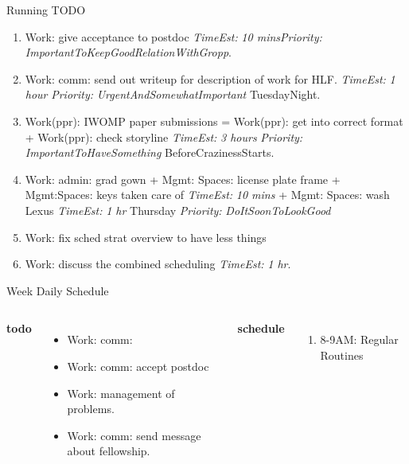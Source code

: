 \documentclass[serif, mathserif, final]{beamer}
\newcommand{\te}[1]{\textit{TimeEst:} \textit{#1}}
\newcommand{\prio}[1]{\textit{Priority:} \textit{#1}}
\newcommand{\dl}[1]{#1}
\begin{document}
\begin{frame}{}
\begin{columns}
\begin{column}{0.50\linewidth}
  \begin{block}{Running TODO} %
    \begin{enumerate}
    \item \small Work: give acceptance to postdoc \te{10
      mins}\prio{ImportantToKeepGoodRelationWithGropp}. 
      \small \item \small Work: comm: send out writeup for description
      of work for HLF. \te{1 hour} \prio{UrgentAndSomewhatImportant}
      \dl{TuesdayNight}.  
    \item \small Work(ppr): IWOMP paper submissions  =  Work(ppr): get into
      correct format  + Work(ppr): check storyline   \te{3 hours} 
      \prio{ImportantToHaveSomething} \dl{BeforeCrazinessStarts}. 
      \item \small  Work: admin: grad gown  + Mgmt: Spaces: license plate frame  + Mgmt:Spaces:
        keys taken care of \te{10 mins} + Mgmt: Spaces: wash
        Lexus \te{1 hr} \dl{Thursday} \prio{DoItSoonToLookGood} 
      \item \small Work: fix sched strat overview to have less things 
      \item \small Work: discuss the combined scheduling \te{1 hr}.

    \end{enumerate}
  \end{block} 

  \begin{block}{Week Daily Schedule}
    \begin{columns} 
      \textbf{\small todo} \\ 
      \begin{itemize}
        \tiny \item \tiny Work: comm: 
        \tiny \item \tiny Work: comm: accept postdoc 
      \item \tiny Work: management of problems.
      \item \tiny Work: comm: send message about fellowship.
      \end{itemize} 
  \textbf{\small schedule} \\
  \begin{enumerate} 
    \tiny \item \tiny 8-9AM: Regular Routines 
  \end{enumerate} 


\end{columns}
\end{block}
\end{column}
\end{columns}
\end{frame}
\end{document}
